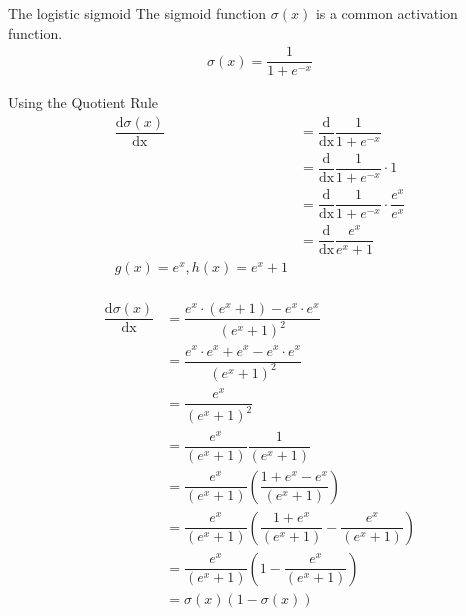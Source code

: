 \documentclass{beamer}
\begin{document}
    \begin{frame}{The logistic sigmoid \cite{goodfellow2016deep}}
      The sigmoid function $\sigma(x)$ is a common activation function.
      \begin{align}
        \sigma(x) = \dfrac{1}{1+e^{-x}}
      \end{align}
      \begin{figure}
      \centering
      
      \end{figure}
    \end{frame}

    \begin{frame}[allowframebreaks]{Using the Quotient Rule}
      \begin{align}
        \dfrac{\text{d} \sigma(x)}{\text{dx}} &= \dfrac{\text{d} }{\text{dx}} \dfrac{1}{1+ e^{-x}} \\
                                              &= \dfrac{\text{d} }{\text{dx}} \dfrac{1}{1+ e^{-x}} \cdot 1 \\
                                              &= \dfrac{\text{d} }{\text{dx}} \dfrac{1}{1+ e^{-x}} \cdot \dfrac{e^x}{e^x} \\
                                              &= \dfrac{\text{d} }{\text{dx}} \dfrac{e^x}{e^x + 1} \\
        g(x) = e^x, h(x) = e^x + 1
    \end{align}
    $\;$
    \begin{align}
      \dfrac{\text{d} \sigma(x)}{\text{dx}} &= \dfrac{e^x \cdot (e^x + 1) - e^x \cdot e^x}{(e^x + 1)^2} \\
                                            &= \dfrac{e^x \cdot e^x + e^x - e^x \cdot e^x}{(e^x + 1)^2} \\
                                            &= \dfrac{e^x}{(e^x + 1)^2} \\
                                            &= \dfrac{e^x}{(e^x + 1)}\dfrac{1}{(e^x + 1)} \\
                                            &= \dfrac{e^x}{(e^x + 1)}(\dfrac{1 + e^x - e^x}{(e^x + 1)}) \\
                                            &= \dfrac{e^x}{(e^x + 1)}(\dfrac{1 + e^x}{(e^x + 1)} - \dfrac{ e^x}{(e^x + 1)}) \\      
                                            &= \dfrac{e^x}{(e^x + 1)}(1 - \dfrac{ e^x}{(e^x + 1)}) \\
                                            &= \sigma(x)(1 - \sigma(x))
    \end{align}
    \end{frame}
\end{document}
